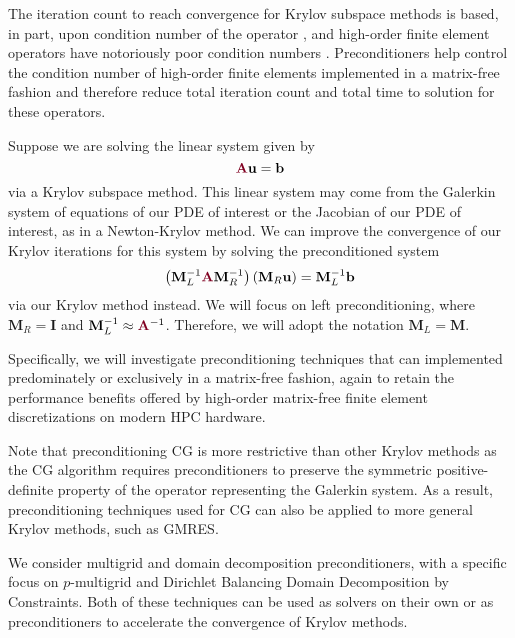 The iteration count to reach convergence for Krylov subspace methods is based, in part, upon condition number of the operator \cite{luenberger1973introduction}, and high-order finite element operators have notoriously poor condition numbers \cite{hu1998bounds}.
Preconditioners help control the condition number of high-order finite elements implemented in a matrix-free fashion and therefore reduce total iteration count and total time to solution for these operators.

Suppose we are solving the linear system given by
\begin{equation}
{\color{burgundy}\mathbf{A}} \mathbf{u} = \mathbf{b}
\label{linear_eqn}
\end{equation}
via a Krylov subspace method.
This linear system may come from the Galerkin system of equations of our PDE of interest or the Jacobian of our PDE of interest, as in a Newton-Krylov method.
We can improve the convergence of our Krylov iterations for this system by solving the preconditioned system
\begin{equation}
\left( \mathbf{M}_L^{-1} {\color{burgundy}\mathbf{A}} \mathbf{M}_R^{-1} \right) \left( \mathbf{M}_R \mathbf{u} \right) = \mathbf{M}_L^{-1} \mathbf{b}
\label{precond_eqn}
\end{equation}
via our Krylov method instead.
We will focus on left preconditioning, where $\mathbf{M}_R = \mathbf{I}$ and $\mathbf{M}_L^{-1} \approx {\color{burgundy}\mathbf{A}}^{-1}$.
Therefore, we will adopt the notation $\mathbf{M}_L = \mathbf{M}$.

Specifically, we will investigate preconditioning techniques that can implemented predominately or exclusively in a matrix-free fashion, again to retain the performance benefits offered by high-order matrix-free finite element discretizations on modern HPC hardware.

Note that preconditioning CG is more restrictive than other Krylov methods as the CG algorithm requires preconditioners to preserve the symmetric positive-definite property of the operator representing the Galerkin system.
As a result, preconditioning techniques used for CG can also be applied to more general Krylov methods, such as GMRES.

We consider multigrid and domain decomposition preconditioners, with a specific focus on $p$-multigrid and Dirichlet Balancing Domain Decomposition by Constraints.
Both of these techniques can be used as solvers on their own or as preconditioners to accelerate the convergence of Krylov methods.